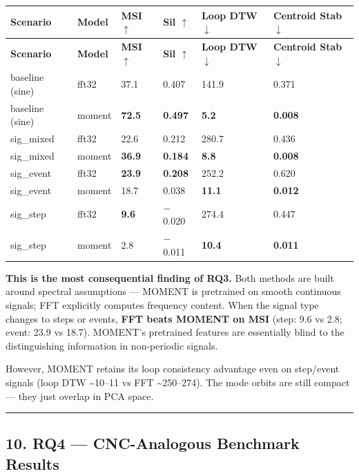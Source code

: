 \documentclass[11pt,a4paper]{article}
\begin{document}
\begin{longtable}{|l|l|l|l|l|l|}
\hline
\textbf{Scenario} & \textbf{Model} & \textbf{MSI $\uparrow$} & \textbf{Sil $\uparrow$} & \textbf{Loop DTW $\downarrow$} & \textbf{Centroid Stab $\downarrow$} \\
\hline
\endfirsthead
\hline
\textbf{Scenario} & \textbf{Model} & \textbf{MSI $\uparrow$} & \textbf{Sil $\uparrow$} & \textbf{Loop DTW $\downarrow$} & \textbf{Centroid Stab $\downarrow$} \\
\hline
\endhead
\hline
\endfoot
baseline (sine) & fft32 & 37.1 & 0.407 & 141.9 & 0.371 \\
\hline
baseline (sine) & moment & \textbf{72.5} & \textbf{0.497} & \textbf{5.2} & \textbf{0.008} \\
\hline
sig\_mixed & fft32 & 22.6 & 0.212 & 280.7 & 0.436 \\
\hline
sig\_mixed & moment & \textbf{36.9} & \textbf{0.184} & \textbf{8.8} & \textbf{0.008} \\
\hline
sig\_event & fft32 & \textbf{23.9} & \textbf{0.208} & 252.2 & 0.620 \\
\hline
sig\_event & moment & 18.7 & 0.038 & \textbf{11.1} & \textbf{0.012} \\
\hline
sig\_step & fft32 & \textbf{9.6} & $-$0.020 & 274.4 & 0.447 \\
\hline
sig\_step & moment & 2.8 & $-$0.011 & \textbf{10.4} & \textbf{0.011} \\
\hline
\end{longtable}

\textbf{This is the most consequential finding of RQ3.} Both methods are built around spectral
assumptions --- MOMENT is pretrained on smooth continuous signals; FFT explicitly computes frequency
content. When the signal type changes to steps or events, \textbf{FFT beats MOMENT on MSI} (step: 9.6
vs 2.8; event: 23.9 vs 18.7). MOMENT's pretrained features are essentially blind to the
distinguishing information in non-periodic signals.

However, MOMENT retains its loop consistency advantage even on step/event signals (loop DTW \textasciitilde{}10--11
vs FFT \textasciitilde{}250--274). The mode orbits are still compact --- they just overlap in PCA space.

\vspace{4pt}\hrule\vspace{4pt}

\subsection{10. RQ4 --- CNC-Analogous Benchmark Results}
\end{document}
